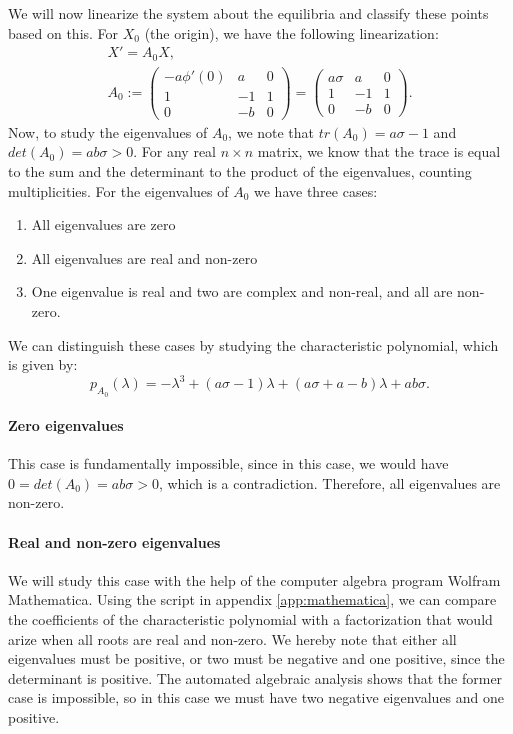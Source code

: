 We will now linearize the system about the equilibria and classify
these points based on this.  For $X_0$ (the origin), we have the
following linearization:
\begin{gather}
  \label{eq:linear-origin}
  X' = A_0 X, \\
  A_0 :=
  \begin{pmatrix}
    -a \phi'(0) & a & 0\\
    1 & -1 & 1\\
    0 & -b & 0
  \end{pmatrix}
  =
  \begin{pmatrix}
    a \sigma & a & 0\\
    1 & -1 & 1\\
    0 & -b & 0
  \end{pmatrix}.
\end{gather}
Now, to study the eigenvalues of $A_0$, we note that $tr(A_0) = a \sigma
- 1$ and $det(A_0) = a b \sigma > 0$.  For any real $n \times n$ matrix,
we know that the trace is equal to the sum and the
determinant to the product of the eigenvalues, counting
multiplicities.  For the eigenvalues of $A_0$ we have three cases:
\begin{enumerate}
\item All eigenvalues are zero
\item All eigenvalues are real and non-zero
\item One eigenvalue is real and two are complex and non-real, and all
  are non-zero.
\end{enumerate}

We can distinguish these cases by studying the characteristic
polynomial, which is given by:
\begin{equation}
  \label{eq:origin-cp}
  p_{A_0}(\lambda) = -\lambda^3+(a\sigma-1)\lambda
  +(a\sigma + a -b) \lambda + a b \sigma.
\end{equation}

\paragraph{Zero eigenvalues}
This case is fundamentally impossible, since in this case, we would
have $0 = det(A_0) = ab\sigma > 0$, which is a contradiction.
Therefore, all eigenvalues are non-zero.

\paragraph{Real and non-zero eigenvalues}
We will study this case with the help of the computer algebra program
Wolfram Mathematica.  Using the script in appendix
\ref{app:mathematica}, we can compare the coefficients of the
characteristic polynomial with a factorization that would arize when
all roots are real and non-zero.  We hereby note that either all
eigenvalues must be positive, or two must be negative and one
positive, since the determinant is positive.  The automated algebraic
analysis shows that the former case is impossible, so in this case we
must have two negative eigenvalues and one positive.

